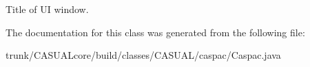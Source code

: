 Title of U\-I window. 

The documentation for this class was generated from the following file\-:\begin{DoxyCompactItemize}
\item 
trunk/\-C\-A\-S\-U\-A\-Lcore/build/classes/\-C\-A\-S\-U\-A\-L/caspac/Caspac.\-java\end{DoxyCompactItemize}

